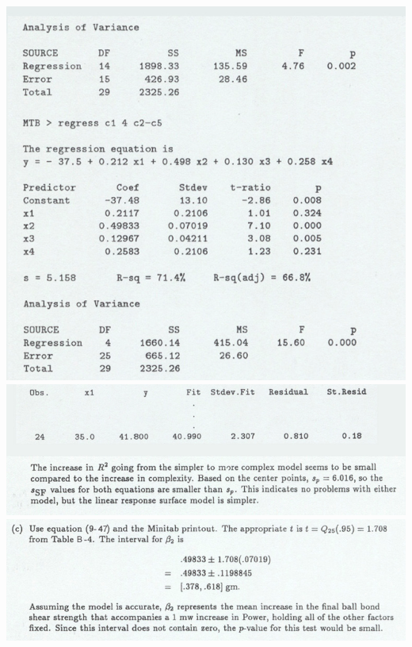 \documentclass{article}\usepackage{graphicx, color}
\numberwithin{equation}{section}
\begin{document}
\begin{flushleft}
\begin{enumerate}[1. ]
 \includegraphics{../../fig/finalreviewp4sol2.png}
 \includegraphics{../../fig/finalreviewp4sol3.png}
 \includegraphics{../../fig/finalreviewp4sol4.png}


\end{enumerate}

\end{flushleft}
\end{document}
